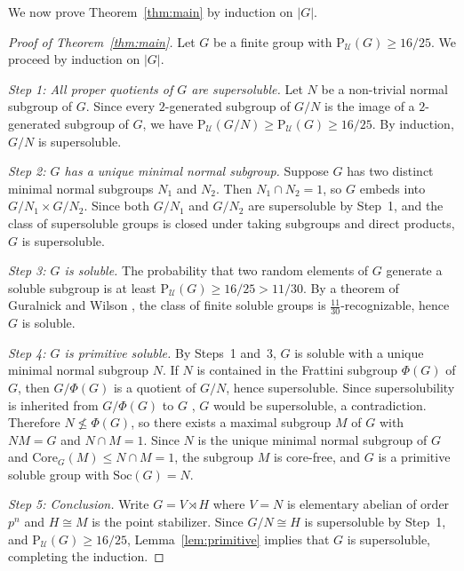 \documentclass[10pt,a4paper]{amsart}
\newcommand{\Psu}{\mathrm{P}_{\mathcal{U}}}
\begin{document}
	We now prove Theorem~\ref{thm:main} by induction on $|G|$.
	

	\begin{proof}[Proof of Theorem~\ref{thm:main}]
		Let $G$ be a finite group with $\Psu(G) \geq 16/25$. We 
		proceed by induction on $|G|$.
		
		\medskip
		\noindent\textit{Step 1: All proper quotients of $G$ are 
			supersoluble.}
		Let $N$ be a non-trivial normal subgroup of $G$. Since every 
		$2$-generated subgroup of $G/N$ is the image of a $2$-generated 
		subgroup of $G$, we have $\Psu(G/N) \geq \Psu(G) \geq 16/25$. 
		By induction, $G/N$ is supersoluble.
		
		\medskip
		\noindent\textit{Step 2: $G$ has a unique minimal normal 
			subgroup.}
		Suppose $G$ has two distinct minimal normal subgroups $N_1$ 
		and $N_2$. Then $N_1 \cap N_2 = 1$, so $G$ embeds into 
		$G/N_1 \times G/N_2$. Since both $G/N_1$ and $G/N_2$ are 
		supersoluble by Step~1, and the class of supersoluble groups 
		is closed under taking subgroups and direct products, $G$ is 
		supersoluble. 
		
		\medskip
		\noindent\textit{Step 3: $G$ is soluble.}
	The probability that two random elements of $G$ generate a 
	soluble subgroup is at least $\Psu(G) \geq 16/25 > 11/30$. 
	By a theorem of Guralnick and Wilson \cite[Theorem A]{GW00}, 
	the class of finite soluble groups is $\frac{11}{30}$-recognizable, 
	hence $G$ is soluble.
		
		\medskip
		\noindent\textit{Step 4: $G$ is primitive soluble.}
		By Steps~1 and~3, $G$ is soluble with a unique minimal normal 
		subgroup $N$. If $N$ is contained in the Frattini subgroup $\Phi(G)$ of $G$, then $G/\Phi(G)$ is a 
		quotient of $G/N$, hence supersoluble. Since supersolubility 
		is inherited from $G/\Phi(G)$ to $G$ \cite[VI Satz 8.6]{hup},
		$G$ would be supersoluble, a contradiction. Therefore 
		$N \not\leq \Phi(G)$, so there exists a maximal subgroup $M$ 
		of $G$ with $NM = G$ and $N \cap M = 1$. Since $N$ is the 
		unique minimal normal subgroup of $G$ and $\mathrm{Core}_G(M) 
		\leq N \cap M = 1$, the subgroup $M$ is core-free, and $G$ 
		is a primitive soluble group with $\mathrm{Soc}(G) = N$.
		
		\medskip
		\noindent\textit{Step 5: Conclusion.}
		Write $G = V \rtimes H$ where $V = N$ is elementary abelian 
		of order $p^n$ and $H \cong M$ is the point stabilizer. 
		Since $G/N \cong H$ is supersoluble by Step~1, and 
		$\Psu(G) \geq 16/25$, Lemma~\ref{lem:primitive} implies 
		that $G$ is supersoluble, completing the induction.
		

\end{proof}
\end{document}

